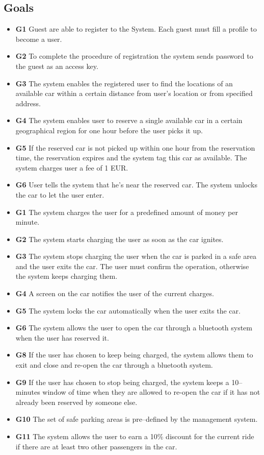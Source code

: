 \documentclass{article}
\begin{document}
		\subsection{Goals}
			\begin{itemize}
				\item \textbf{G1} Guest are able to register to the System. Each guest must fill a profile to become a user.
				\item \textbf{G2} To complete the procedure of registration the system sends password to the guest as an access key.
				\item \textbf{G3} The system enables the registered user to find the locations of an available car within a certain distance from user's location or from specified address.
				\item \textbf{G4} The system enables user to reserve a single available car in a certain geographical region for one hour before the user picks it up.
				\item \textbf{G5} If the reserved car is not picked up within one hour from the reservation time, the reservation expires and the system tag this car as available. The system charges user a fee of 1 EUR. 
				\item \textbf{G6} User tells the system that he's near the reserved car. The system unlocks the car to let the user enter.  

				\item \textbf{G1} The system charges the user for a predefined amount of money per minute.
				\item \textbf{G2} The system starts charging the user as soon as the car ignites.
				\item \textbf{G3} The system stops charging the user when the car is parked in a safe area and the user exits the car. The user must confirm the operation, otherwise the system keeps charging them. 
				\item \textbf{G4} A screen on the car notifies the user of the current charges.
				\item \textbf{G5} The system locks the car automatically when the user exits the car. 
				\item \textbf{G6} The system allows the user to open the car through a bluetooth system when the user has reserved it.
				\item \textbf{G8} If the user has chosen to keep being charged, the system allows them to exit and close and re-open the car through a bluetooth system.
				\item \textbf{G9} If the user has chosen to stop being charged, the system keeps a 10–minutes window of time when they are allowed to re-open the car if it has not already been reserved by someone else.
				\item \textbf{G10} The set of safe parking areas is pre–defined by the management system.
				\item \textbf{G11} The system allows the user to earn a 10\% discount for the current ride if there are at least two other passengers in the car.


\end{itemize}
\end{document}
